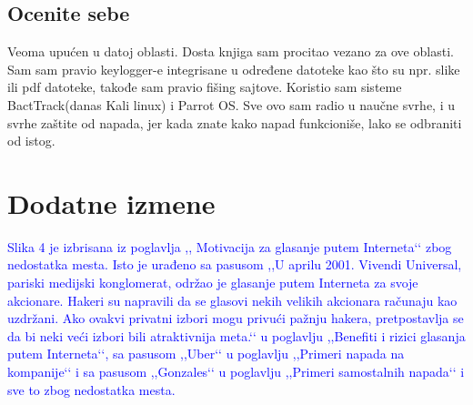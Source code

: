 \documentclass[a4paper]{report}
\newcommand{\odgovor}[1]{\textcolor{blue}{#1}}
\begin{document}
\section{Ocenite sebe}
Veoma upućen u datoj oblasti. Dosta knjiga sam procitao vezano za ove oblasti. Sam sam pravio keylogger-e integrisane u određene datoteke kao što su npr. slike ili pdf datoteke, takođe sam pravio fišing sajtove. Koristio sam sisteme BactTrack(danas Kali linux) i Parrot OS. Sve ovo sam radio u naučne svrhe, i u svrhe zaštite od napada, jer kada znate kako napad funkcioniše, lako  se odbraniti od istog.



\chapter{Dodatne izmene}
\odgovor{Slika 4 je izbrisana iz poglavlja ,, Motivacija za glasanje putem Interneta‘‘ zbog nedostatka mesta. Isto je urađeno sa pasusom ,,U aprilu 2001. Vivendi Universal, pariski medijski konglomerat, održao je glasanje putem Interneta za svoje akcionare. Hakeri su napravili da se glasovi nekih velikih akcionara računaju kao uzdržani. Ako ovakvi privatni izbori mogu privući pažnju hakera, pretpostavlja se da bi neki veći izbori bili atraktivnija meta.‘‘ u poglavlju ,,Benefiti i rizici glasanja putem Interneta‘‘, sa pasusom ,,Uber‘‘ u poglavlju ,,Primeri napada na kompanije‘‘ i sa pasusom ,,Gonzales‘‘ u poglavlju ,,Primeri samostalnih napada‘‘ i sve to zbog nedostatka mesta.}
\end{document}

